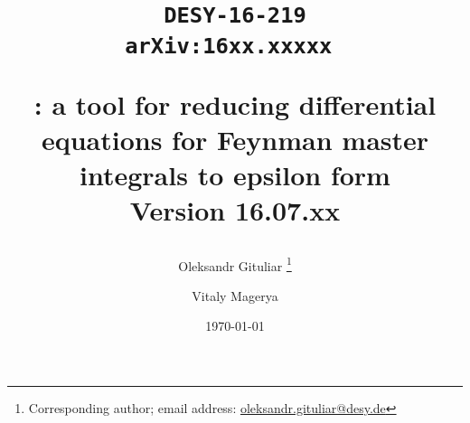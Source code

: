 \title{
  \begin{flushright}
  \tt\normalsize{DESY-16-219}\\ 
  \tt\normalsize{arXiv:16xx.xxxxx} 
  \end{flushright}
  \vspace{1cm}
  \Large \bf \fuchsia: a tool for reducing differential equations for Feynman master integrals to epsilon form\\
  \vspace{0.5cm}
  \normalsize \bf Version 16.07.xx
}

\author[a]{Oleksandr Gituliar%
    \thanks{Corresponding author; email address:
        \href{mailto:oleksandr.gituliar@desy.de}
            {oleksandr.gituliar@desy.de}}}

\author[b]{Vitaly Magerya}


\date{\today\\\vspace{0.5cm}{\bf \LARGE DRAFT}}
